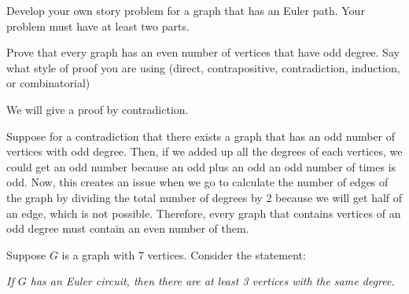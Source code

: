 \begin{questions}
\begin{solution}
\end{solution}




\question[6] Develop your own story problem for a graph that has an Euler path. Your problem must have at least two parts.
%

\question[4] Prove that every graph has an even number of vertices that have odd degree.  Say what style of proof you are using (direct, contrapositive, contradiction, induction, or combinatorial)
\begin{solution}
	We will give a proof by contradiction.

	Suppose for a contradiction that there exists a graph that has an odd number of vertices with odd degree. Then, if we added up all the degrees of each vertices, we could get an odd number because an odd plus an odd an odd number of times is odd. Now, this creates an issue when we go to calculate the number of edges of the graph by dividing the total number of degrees by 2 because we will get half of an edge, which is not possible. Therefore, every graph that contains vertices of an odd degree must contain an even number of them.
\end{solution}









\question[6] Suppose $G$ is a graph with 7 vertices.  Consider the statement:

\centerline{\textit{If $G$ has an Euler circuit, then there are at least 3 vertices with the same degree.}}

\end{questions}
